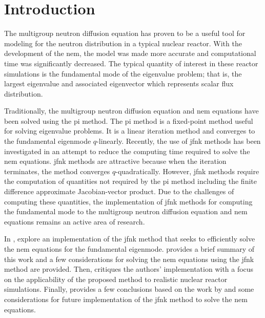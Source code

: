 \section{Introduction}
\label{sec:introduction}

  The multigroup neutron diffusion equation has proven to be a useful tool for
  modeling for the neutron distribution in a typical nuclear reactor. With the
  development of the \gls{nem}, the model was made more accurate and
  computational time was significantly decreased. The typical quantity of
  interest in these reactor simulations is the fundamental mode of the
  eigenvalue problem; that is, the largest eigenvalue and associated eigenvector
  which represents scalar flux distribution.

  Traditionally, the multigroup neutron diffusion equation and \gls{nem}
  equations have been solved using the \gls{pi} method. The \gls{pi} method is a
  fixed-point method useful for solving eigenvalue problems. It is a linear
  iteration method and converges to the fundamental eigenmode $q$-linearly.
  Recently, the use of \gls{jfnk} methods has been investigated in an attempt to
  reduce the computing time required to solve the \gls{nem} equations.
  \gls{jfnk} methods are attractive because when the iteration terminates, the
  method converges $q$-quadratically. However, \gls{jfnk} methods require the
  computation of quantities not required by the \gls{pi} method including the
  finite difference approximate Jacobian-vector product. Due to the challenges
  of computing these quantities, the implementation of \gls{jfnk} methods for
  computing the fundamental mode to the multigroup neutron diffusion equation
  and \gls{nem} equations remains an active area of research.

  In , \citeauthor{qe2paper} explore an implementation of
  the \gls{jfnk} method that seeks to efficiently solve the \gls{nem} equations
  for the fundamental eigenmode.  provides a brief summary of
  this work and a few considerations for solving the \gls{nem} equations using
  the \gls{jfnk} method are provided. Then,  critiques the
  authors' implementation with a focus on the applicability of the proposed
  method to realistic nuclear reactor simulations. Finally,
   provides a few conclusions based on the work by
  \citeauthor{qe2paper} and some considerations for future implementation of the 
  \gls{jfnk} method to solve the \gls{nem} equations.
